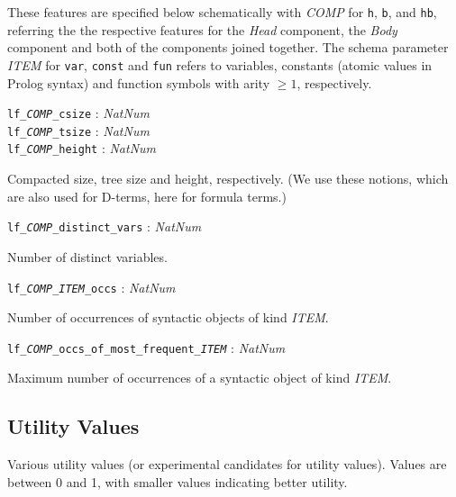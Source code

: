 \documentclass[a4paper,11pt]{article}
\newcommand{\f}[1]{\texttt{#1}}
\newcommand{\var}[1]{\textnormal{\textit{#1}}}
\newcommand{\lit}[1]{\textnormal{\textit{#1}}}
\newcommand{\propsig}[2]
{\noindent \f{#1} : #2}
\newcommand{\propdesc}[1]
{\par \hspace*{\fill}\begin{minipage}{0.9\textwidth}#1\end{minipage}\par\smallskip}
\begin{document}
These features are specified below schematically with \var{COMP} for \f{h},
\f{b}, and \f{hb}, referring the the respective features for the \var{Head}
component, the \var{Body} component and both of the components joined
together. The schema parameter \var{ITEM} for \f{var}, \f{const} and \f{fun}
refers to variables, constants (atomic values in Prolog syntax) and
function symbols with arity $\geq 1$, respectively.

\propsig{lf\_\var{COMP}\_csize}{\lit{NatNum}}\\
\propsig{lf\_\var{COMP}\_tsize}{\lit{NatNum}}\\
\propsig{lf\_\var{COMP}\_height}{\lit{NatNum}}

\propdesc{Compacted size, tree size and height, respectively. (We use these
  notions, which are also used for D-terms, here for formula terms.)}

\propsig{lf\_\var{COMP}\_distinct\_vars}{\lit{NatNum}}
\propdesc{Number of distinct variables.}

\propsig{lf\_\var{COMP}\_\var{ITEM}\_occs}{\lit{NatNum}}
\propdesc{Number of occurrences of syntactic objects of kind \var{ITEM}.}

\propsig{lf\_\var{COMP}\_occs\_of\_most\_frequent\_\var{ITEM}}{\lit{NatNum}}
\propdesc{Maximum number of occurrences of a syntactic object of kind \var{ITEM}.}

\subsection{Utility Values}

Various utility values (or experimental candidates for utility values). Values
are between 0 and 1, with smaller values indicating better utility.
\end{document}

